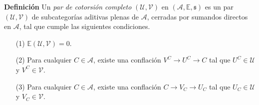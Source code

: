 \documentclass[preview]{standalone}
\begin{document}
\begin{center}
\justifying \textbf{Definición} Un \emph{par de cotorsión completo} $(\mathcal{U}, \mathcal{V})$ en $(\mathscr{A}, \mathbb{E}, \mathfrak{s})$ es un par $(\mathcal{U}, \mathcal{V})$ de subcategorías aditivas plenas de $\mathscr{A}$, cerradas por sumandos directos en $\mathscr{A}$, tal que cumple las siguientes condiciones.\begin{itemize} \item[(1)] $\mathbb{E}(\mathcal{U}, \mathcal{V}) = 0$. \item[(2)] Para cualquier $C\in\mathscr{A}$, existe una conflación $V^C\to U^C\to C$ tal que $U^C\in\mathcal{U}$ y $V^C\in\mathcal{V}$. \item[(3)] Para cualquier $C\in\mathscr{A}$, existe una conflación $C\to V_C\to U_C$ tal que $U_C\in\mathcal{U}$ y $V_C\in\mathcal{V}$. \end{itemize}
\end{center}
\end{document}
